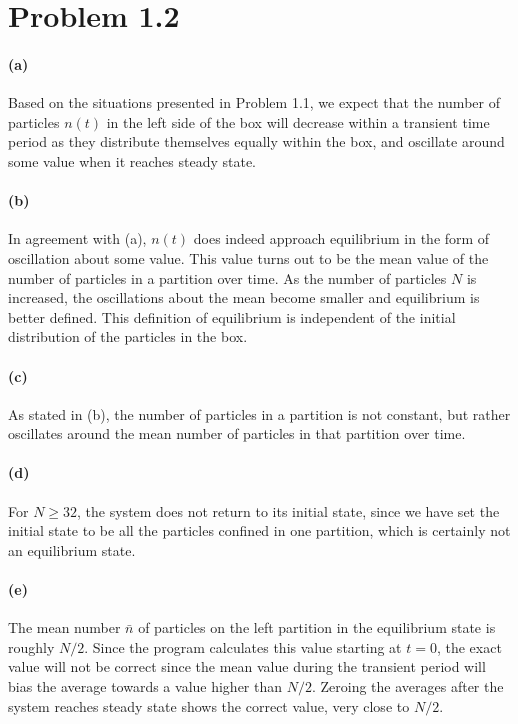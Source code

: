 \documentclass[12pt,a4paper,twocolumn]{article}
\begin{document}
\setcounter{page}{1}

\section*{Problem 1.2}

\paragraph{(a)}
Based on the situations presented in Problem 1.1, we expect that the number of particles $n(t)$ in the left side of the box will decrease within a transient time period as they distribute themselves equally within the box, and oscillate around some value when it reaches steady state.

\paragraph{(b)}
In agreement with (a), $n(t)$ does indeed approach equilibrium in the form of oscillation about some value. This value turns out to be the mean value of the number of particles in a partition over time. As the number of particles $N$ is increased, the oscillations about the mean become smaller and equilibrium is better defined. This definition of equilibrium is independent of the initial distribution of the particles in the box.

\paragraph{(c)}
As stated in (b), the number of particles in a partition is not constant, but rather oscillates around the mean number of particles in that partition over time.

\paragraph{(d)}
For $N \geq 32$, the system does not return to its initial state, since we have set the initial state to be all the particles confined in one partition, which is certainly not an equilibrium state.

\paragraph{(e)}
The mean number $\bar{n}$ of particles on the left partition in the equilibrium state is roughly $N/2$. Since the program calculates this value starting at $t = 0$, the exact value will not be correct since the mean value during the transient period will bias the average towards a value higher than $N/2$. Zeroing the averages after the system reaches steady state shows the correct value, very close to $N/2$.
\end{document}
